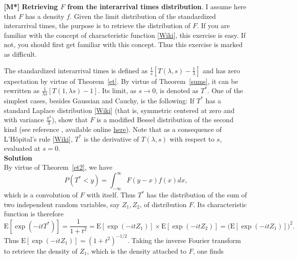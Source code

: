 \documentclass[10pt]{article}
\begin{document}
\begin{Exercise}\label{exercise13}{\bf [M*]}
{\bf Retrieving $F$ from the interarrival times distribution}. I assume here that $F$ has a density $f$. Given the limit distribution of the standardized interarrival times, the purpose is to retrieve the distribution of $F$. If you are familiar with the concept of
\textcolor{index}{characteristic function} [\href{https://en.wikipedia.org/wiki/Characteristic_function_(probability_theory)}{Wiki}],
this exercise is easy. If not, you should first get familiar with this concept. Thus this exercise is marked as difficult.

The \textcolor{index}{standardized interarrival times}
is defined as $\frac{1}{s}[T(\lambda,s)-\frac{1}{\lambda}]$ and has zero expectation by virtue of Theorem~\ref{et}. By virtue of Theorem~\ref{sums}, it can be rewritten as
$\frac{1}{\lambda s}[T(1,\lambda s)-1]$. Its limit, as $s\rightarrow 0$, is denoted as $T^*$. One of the simplest cases, besides Gaussian and Cauchy, is the following: If $T^*$ has a standard
\textcolor{index}{Laplace distribution} [\href{https://en.wikipedia.org/wiki/Laplace_distribution}{Wiki}]
(that is, symmetric centered at zero and with variance $\frac{\pi^2}{3}$), show that $F$ is a
\textcolor{index}{modified Bessel distribution} of the second kind (see reference \cite{bessel}, available online
\href{https://www.researchgate.net/publication/46553454_A_Modified_Bessel_Distribution_of_the_Second_Kind}{here}). Note that as a consequence of L'Hôpital's rule
[\href{https://bit.ly/3sQXEbL}{Wiki}], $T^*$ is the derivative of $T(\lambda,s)$ with respect to $s$, evaluated at $s=0$. \vspace{1ex}   \\
{\bf Solution} \vspace{1ex}   \\
By virtue of Theorem~\ref{et2}, we have
$$P(T^*<y)=\int_{-\infty}^{\infty} F(y-x)f(x)dx,$$
which is a \textcolor{index}{convolution} of $F$ with itself.
Thus $T^*$ has the distribution of the sum of two independent random variables, say $Z_1,Z_2$, of distribution $F$. Its characteristic function is therefore
$$\mbox{E}[\exp(-it T^*)]=\frac{1}{1 + t^2} = \mbox{E}[\exp(-it Z_1)]\times \mbox{E}[\exp(-it Z_2)]=\Big(\mbox{E}[\exp(-it Z_1)]\Big)^2.$$
Thus $\mbox{E}[\exp(-it Z_1)]=(1 + t^2)^{-1/2}$. Taking the inverse \textcolor{index}{Fourier transform} to retrieve the density of $Z_1$, which is the density attached to $F$, one finds

\end{Exercise}
\end{document}
